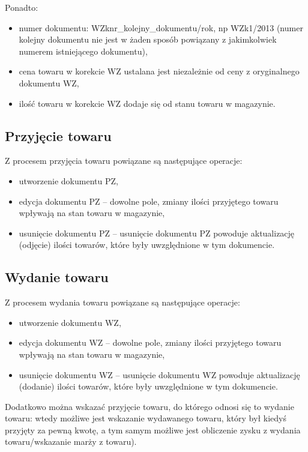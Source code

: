 Ponadto:
\begin{itemize}
\item numer dokumentu: WZknr\_kolejny\_dokumentu/rok, np WZk1/2013
  (numer kolejny dokumentu nie jest w żaden sposób powiązany z
  jakimkolwiek numerem istniejącego dokumentu),
\item cena towaru w korekcie WZ ustalana jest niezależnie od ceny z
  oryginalnego dokumentu WZ,
\item ilość towaru w korekcie WZ dodaje się od stanu towaru w
  magazynie.
\end{itemize}

\subsection{Przyjęcie towaru}
Z procesem przyjęcia towaru powiązane są następujące operacje:
\begin{itemize}
\item utworzenie dokumentu PZ,
\item edycja dokumentu PZ -- dowolne pole, zmiany ilości przyjętego
  towaru wpływają na stan towaru w magazynie,
\item usunięcie dokumentu PZ -- usunięcie dokumentu PZ powoduje
  aktualizację (odjęcie) ilości towarów, które były uwzględnione w tym
  dokumencie.
\end{itemize}

\subsection{Wydanie towaru}
Z procesem wydania towaru powiązane są następujące operacje:
\begin{itemize}
\item utworzenie dokumentu WZ,
\item edycja dokumentu WZ -- dowolne pole, zmiany ilości przyjętego
  towaru wpływają na stan towaru w magazynie,
\item usunięcie dokumentu WZ -- usunięcie dokumentu WZ powoduje
  aktualizację (dodanie) ilości towarów, które były uwzględnione w tym
  dokumencie.
\end{itemize}

Dodatkowo można wskazać przyjęcie towaru, do którego odnosi się to
wydanie towaru: wtedy możliwe jest wskazanie wydawanego towaru, który
był kiedyś przyjęty za pewną kwotę, a tym samym możliwe jest
obliczenie zysku z wydania towaru/wskazanie marży z towaru).

